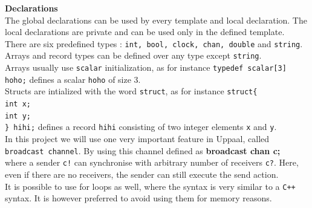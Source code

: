 \documentclass[a4paper, twocolumn]{article}
\begin{document}
\noindent\textbf{Declarations}\\
The global declarations can be used by every template and local declaration. The local declarations are private and can be used only in the defined template.\\
There are six predefined types : \texttt{int, bool, clock, chan, double} and \texttt{string}. Arrays and record types can be defined over any type except \texttt{string}. \\
Arrays usually use \texttt{scalar} initialization, as for instance \colorbox{backcolour}{\texttt{typedef scalar[3] hoho;}} defines a scalar \texttt{hoho} of size 3.\\
Structs are intialized with the word \texttt{struct}, as for instance \colorbox{backcolour}{\texttt{struct\{ \\int x;\\int y;\\ \} hihi;}} defines a record \texttt{hihi} consisting of two integer elements \texttt{x} and \texttt{y}.\\
In this project we will use one very important feature in Uppaal, called \texttt{broadcast channel}. By using this channel defined as \colorbox{backcolour}{\textbf{broadcast chan c;}}\\
where a sender \texttt{c!} can synchronise with arbitrary  number of receivers \texttt{c?}. Here, even if there are no receivers, the sender can still execute the send action.\\
It is possible to use for loops as well, where the syntax is very similar to a \texttt{C++} syntax. It is however preferred to avoid using them for memory reasons.\\
\end{document}
